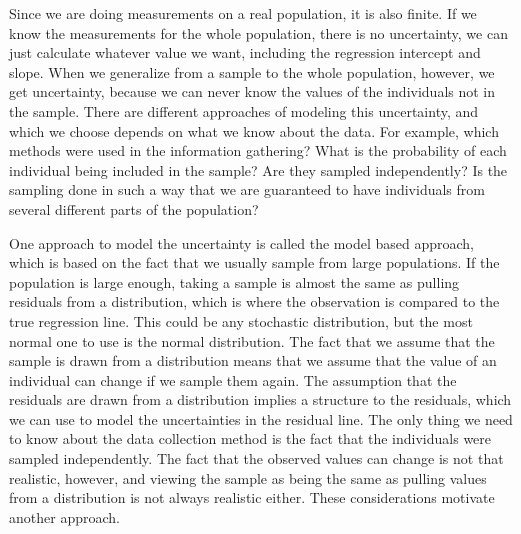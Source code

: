 \documentclass{article}
\begin{document}
Since we are doing measurements on a real population, it is also finite.
If we know the measurements for the whole population, there
is no uncertainty, we can just calculate whatever value we
want, including the regression intercept and slope. When we generalize from a sample to the whole population, however, we get
uncertainty, because we can never know the values of the individuals not in the sample. There are different approaches of modeling this uncertainty, and
which we choose depends on what we know about the data. For example, which
methods were used in the information gathering?
What is the probability of each
individual being included in the sample? Are they sampled independently? Is the
sampling done in such a way that we are guaranteed to have individuals from
several different parts of the population?

One approach to model the uncertainty is called the model based approach, which
is based on the fact that we usually sample from large populations. If the
population is large enough, taking a sample is almost the same as pulling
residuals from a distribution, which is where the observation is compared to the
true regression line. This could be any stochastic distribution, but the most
normal one to use is the normal distribution. The fact that we assume that the
sample is drawn from a distribution means that we assume that the value of an
individual can change if we sample them again. The assumption that the residuals
are drawn from a distribution implies a structure to the residuals, which we
can use to model the uncertainties in the residual line. The only thing we need
to know about the data collection method is the fact that the individuals were
sampled independently. The fact that the observed values can change is not that
realistic, however, and viewing the sample as being the same as pulling values
from a distribution is not always realistic either. These considerations
motivate another approach.

\end{document}
